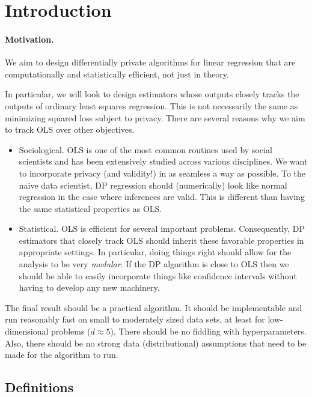 
\section{Introduction}

\paragraph{Motivation.} We aim to design differentially private algorithms for linear regression that are computationally and statistically efficient, not just in theory.

In particular, we will look to design estimators whose outputs closely tracks the outputs of ordinary least squares regression. This is not necessarily the same as minimizing squared loss subject to privacy. There are several reasons why we aim to track OLS over other objectives.
\begin{itemize}
	\item Sociological. OLS is one of the most common routines used by social scientists and has been extensively studied across various disciplines.  We want to incorporate privacy (and validity!) in as seamless a way as possible. To the naive data scientist, DP regression should (numerically) look like normal regression in the case where inferences are valid. This is different than having the same statistical properties as OLS.
	\item Statistical. OLS is efficient for several important problems. Consequently, DP estimators that closely track OLS should inherit these favorable properties in appropriate settings. In particular, doing things right should allow for the analysis to be very \emph{modular}. If the DP algorithm is close to OLS then we should be able to easily incorporate things like confidence intervals without having to develop any new machinery.
\end{itemize}

The final result should be a practical algorithm. It should be implementable and run reasonably fast on small to moderately sized data sets, at least for low-dimensional problems ($d \approx 5$). There should be no fiddling with hyperparameters. Also, there should be no strong data (distributional) assumptions that need to be made for the algorithm to run. 

\subsection{Definitions}

